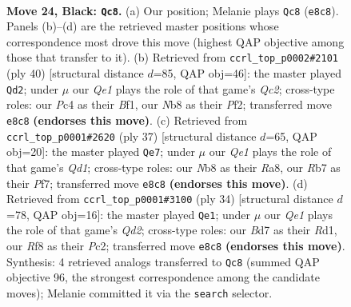 \documentclass[11pt]{article}
\begin{document}
\clearpage

\begin{figure}[p]\centering
\begin{subfigure}{0.46\textwidth}\centering
\resizebox{\linewidth}{!}{%
\newchessgame
\chessboard[
  setfen={1n2qrk1/1r1b1ppp/8/4Pp2/p1p2P2/6K1/PPP3PP/1R1Q1BNR b - - 3 24},
  showmover=false,
  pgfstyle=straightmove, color=movearrow, markmove={e8-c8}
]}
\caption{}
\end{subfigure}\hfill
\begin{subfigure}{0.46\textwidth}\centering
\resizebox{\linewidth}{!}{%
\newchessgame
\chessboard[
  setfen={2rr2k1/1b1n1p1p/3q2p1/p1pp4/8/PPR1PN1P/2Q2PP1/3R1BK1 w - - 3 21},
  showmover=false,
  pgfstyle=straightmove, color=movearrow, markmove={c2-d2}
]}
\caption{}
\end{subfigure}
\\[4pt]
\begin{subfigure}{0.46\textwidth}\centering
\resizebox{\linewidth}{!}{%
\newchessgame
\chessboard[
  setfen={r2qr1k1/1p3ppp/2pp1b2/p7/P1P5/5QP1/1P2PP1P/1RB2RK1 b - - 0 19},
  showmover=false,
  pgfstyle=straightmove, color=movearrow, markmove={d8-e7}
]}
\caption{}
\end{subfigure}\hfill
\begin{subfigure}{0.46\textwidth}\centering
\resizebox{\linewidth}{!}{%
\newchessgame
\chessboard[
  setfen={r3kbr1/3b1p2/1q1ppp2/p6p/1p1RPP1P/8/PPPQN1P1/1K1R1B2 w q - 1 18},
  showmover=false,
  pgfstyle=straightmove, color=movearrow, markmove={d2-e1}
]}
\caption{}
\end{subfigure}
\caption{\textbf{Move 24, Black: \texttt{Qc8}.} (a) Our position; Melanie plays \texttt{Qc8} (\texttt{e8c8}). Panels (b)--(d) are the retrieved master positions whose correspondence most drove this move (highest QAP objective among those that transfer to it). (b) Retrieved from \texttt{ccrl\_top\_p0002\#2101} (ply 40) [structural distance $d$=85, QAP obj=46]: the master played \texttt{Qd2}; under $\mu$ our \emph{Qe1} plays the role of that game's \emph{Qc2}; cross-type roles: our \emph{P}c4 as their \emph{B}f1, our \emph{N}b8 as their \emph{P}f2; transferred move \texttt{e8c8} \textbf{(endorses this move)}. (c) Retrieved from \texttt{ccrl\_top\_p0001\#2620} (ply 37) [structural distance $d$=65, QAP obj=20]: the master played \texttt{Qe7}; under $\mu$ our \emph{Qe1} plays the role of that game's \emph{Qd1}; cross-type roles: our \emph{N}b8 as their \emph{R}a8, our \emph{R}b7 as their \emph{P}f7; transferred move \texttt{e8c8} \textbf{(endorses this move)}. (d) Retrieved from \texttt{ccrl\_top\_p0001\#3100} (ply 34) [structural distance $d$=78, QAP obj=16]: the master played \texttt{Qe1}; under $\mu$ our \emph{Qe1} plays the role of that game's \emph{Qd2}; cross-type roles: our \emph{B}d7 as their \emph{R}d1, our \emph{R}f8 as their \emph{P}c2; transferred move \texttt{e8c8} \textbf{(endorses this move)}. Synthesis: 4 retrieved analogs transferred to \texttt{Qc8} (summed QAP objective 96, the strongest correspondence among the candidate moves); Melanie committed it via the \texttt{search} selector.}
\label{fig:thought-m47}
\end{figure}
\end{document}
